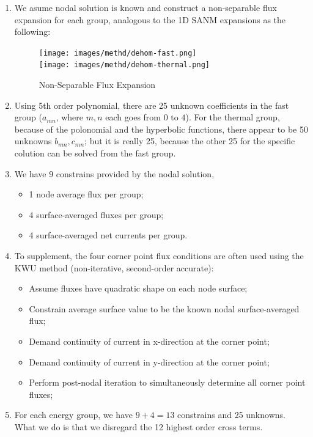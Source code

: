 \documentclass{school-22.211-notes}
\begin{document}
\begin{enumerate}
\item We asume nodal solution is known and construct a non-separable flux expansion for each group, analogous to the 1D SANM expansions as the following:
\begin{figure}[ht]
  \centering
  \texttt{[image: images/methd/dehom-fast.png]} 
  \\
  \texttt{[image: images/methd/dehom-thermal.png]}   
  \caption{Non-Separable Flux Expansion} \label{dehom-energy-group}
\end{figure}

\item Using 5th order polynomial, there are 25 unknown coefficients in the fast group ($a_{mn}$, where $m,n$ each goes from $0$ to $4$). For the thermal group, because of the polonomial and the hyperbolic functions, there appear to be 50 unknowns $b_{mn}, c_{mn}$; but it is really 25, because the other 25 for the specific colution can be solved from the fast group.

\item We have 9 constrains provided by the nodal solution, 
  \begin{itemize}
    \item 1 node average flux per group; 
    \item 4 surface-averaged fluxes per group;
    \item 4 surface-averaged net currents per group. 
  \end{itemize}
  
\item To supplement, the four corner point flux conditions are often used using the KWU method (non-iterative, second-order accurate): 
  \begin{itemize}
    \item Assume fluxes have quadratic shape on each node surface;
    \item Constrain average surface value to be the known nodal surface-averaged flux;
    \item Demand continuity of current in x-direction at the corner point; 
    \item Demand continuity of current in y-direction at the corner point;
    \item Perform post-nodal iteration to simultaneously determine all corner point fluxes;
  \end{itemize}

\item For each energy group, we have $9 + 4 = 13$ constrains and 25 unknowns. What we do is that we disregard the 12 highest order cross terms. 
\end{enumerate}
\end{document}
